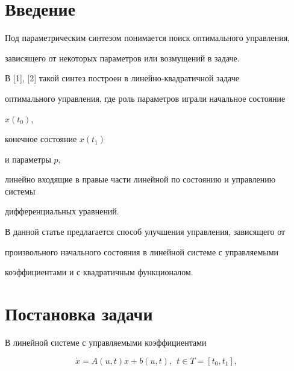 \pagestyle{plain} %







\maketitle


\label{begin}





\section*{Введение}





Под параметрическим синтезом понимается поиск оптимального управления,


зависящего от некоторых параметров или возмущений в задаче.


В [1], [2] такой синтез построен в линейно-квадратичной задаче 


оптимального управления, где роль параметров играли начальное состояние 


$x(t_0)$,


конечное состояние $x(t_1)$


и параметры $p$, 


линейно входящие в правые части линейной по состоянию и управлению системы 


дифференциальных уравнений.


В данной статье предлагается способ улучшения управления, зависящего от 


произвольного начального состояния в линейной системе с управляемыми 


коэффициентами и с квадратичным функционалом.








\section{Постановка задачи}





В линейной системе с управляемыми коэффициентами


\begin{equation}


\Dot x=A(u,t)x+b(u,t),\ \  t\in T=[t_0,t_1],


\end{equation}


